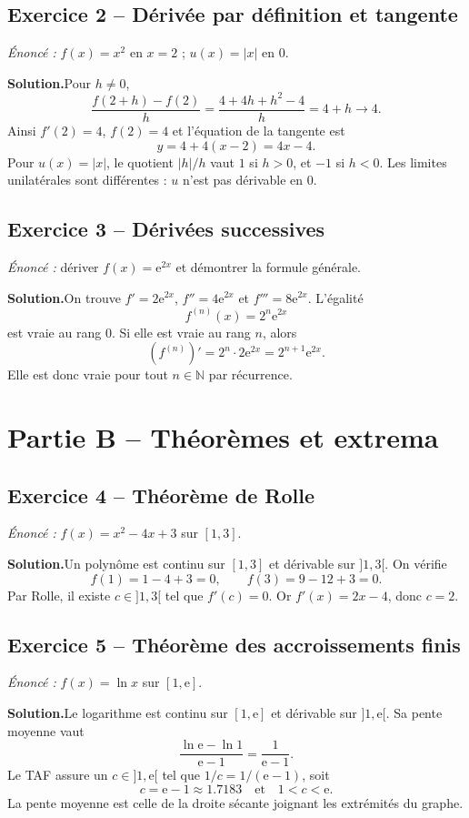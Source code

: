 \documentclass[11pt,a4paper,oneside]{article}
\newcommand{\e}{\mathrm e}
\newcommand{\solution}{\textbf{\color{Sarcelle}Solution.}\enspace}
\begin{document}
\subsection*{Exercice 2 -- Dérivée par définition et tangente}
\textit{Énoncé :} $f(x)=x^2$ en $x=2$ ; $u(x)=|x|$ en $0$.

\solution Pour $h\ne0$,
\[\frac{f(2+h)-f(2)}h=\frac{4+4h+h^2-4}{h}=4+h\longrightarrow4.\]
Ainsi $f'(2)=4$, $f(2)=4$ et l'équation de la tangente est
\[\boxed{y=4+4(x-2)=4x-4}.\]
Pour $u(x)=|x|$, le quotient $|h|/h$ vaut $1$ si $h>0$, et $-1$ si $h<0$. Les limites unilatérales sont différentes : $u$ n'est pas dérivable en $0$.

\subsection*{Exercice 3 -- Dérivées successives}
\textit{Énoncé :} dériver $f(x)=\e^{2x}$ et démontrer la formule générale.

\solution On trouve $f'=2\e^{2x}$, $f''=4\e^{2x}$ et $f'''=8\e^{2x}$. L'égalité
\[\boxed{f^{(n)}(x)=2^n\e^{2x}}\]
est vraie au rang $0$. Si elle est vraie au rang $n$, alors
\[(f^{(n)})'=2^n\cdot2\e^{2x}=2^{n+1}\e^{2x}.\]
Elle est donc vraie pour tout $n\in\mathbb N$ par récurrence.

\section*{Partie B -- Théorèmes et extrema}
\subsection*{Exercice 4 -- Théorème de Rolle}
\textit{Énoncé :} $f(x)=x^2-4x+3$ sur $[1,3]$.

\solution Un polynôme est continu sur $[1,3]$ et dérivable sur $]1,3[$. On vérifie
\[f(1)=1-4+3=0,\qquad f(3)=9-12+3=0.\]
Par Rolle, il existe $c\in]1,3[$ tel que $f'(c)=0$. Or $f'(x)=2x-4$, donc $\boxed{c=2}$.

\subsection*{Exercice 5 -- Théorème des accroissements finis}
\textit{Énoncé :} $f(x)=\ln x$ sur $[1,\e]$.

\solution Le logarithme est continu sur $[1,\e]$ et dérivable sur $]1,\e[$. Sa pente moyenne vaut
\[\frac{\ln\e-\ln1}{\e-1}=\frac1{\e-1}.\]
Le TAF assure un $c\in]1,\e[$ tel que $1/c=1/(\e-1)$, soit
\[\boxed{c=\e-1\approx1.7183}\quad\text{et}\quad1<c<\e.\]
La pente moyenne est celle de la droite sécante joignant les extrémités du graphe.
\end{document}
